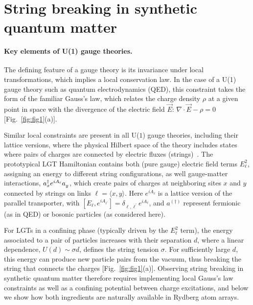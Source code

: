 \documentclass[footinbib,a4paper,aps,superscriptaddress,twocolumn,preprintnumbers,amsmath,amssymb,nobalancelastpage,10pt,prl]{revtex4-2}
\begin{document}
\section*{String breaking in synthetic quantum matter}

\paragraph{Key elements of U(1) gauge theories.}
The defining feature of a gauge theory is its invariance under local transformations, which implies a local conservation law. In the case of a U(1) gauge theory such as quantum electrodynamics (QED), this constraint takes the form of the familiar Gauss's law, which relates the charge density $\rho$ at a given point in space with the divergence of the electric field $\vec{E}$: $\nabla \cdot \vec{E} - \rho = 0$ [Fig.~\ref{fig:fig1}(a)].

Similar local constraints are present in all U($1$) gauge theories, including their lattice versions, where the physical Hilbert space of the theory includes states where pairs of charges are connected by electric fluxes (strings)~\cite{Kogut_1975}. The prototypical LGT Hamiltonian contains both (pure gauge) electric field terms $E^2_\ell$, assigning an energy to different string configurations, as well gauge-matter interactions, $a^\dagger_x e^{iA_\ell} a^{\vphantom{\dagger}}_y$, which create pairs of charges at neighboring sites $x$ and $y$ connected by strings on links $\ell = \langle x, y \rangle$. Here $e^{iA_\ell}$ is a lattice version of the parallel transporter, with $[E_\ell, e^{iA_{\ell^\prime}}] = \delta_{\ell, \ell^\prime} e^{iA_\ell}$, and $a^{(\dagger)}$ represent fermionic (as in QED) or bosonic particles (as considered here).

For LGTs in a confining phase (typically driven by the $E^2_\ell$ term), the energy associated to a pair of particles increases with their separation $d$, where a linear dependence, $U(d) \sim \sigma d$, defines the string tension $\sigma$. For sufficiently large $d$, this energy can produce new particle pairs from the vacuum, thus breaking the string that connects the charges [Fig.~\ref{fig:fig1}(a)]. Observing string breaking in synthetic quantum matter therefore requires implementing local Gauss's law constraints as well as a confining potential between charge excitations, and below we show how both ingredients are naturally available in Rydberg atom arrays. 

\end{document}
